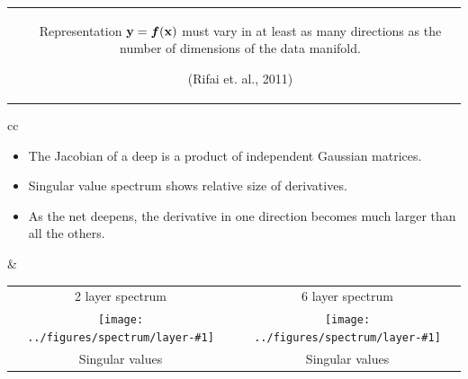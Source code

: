 \documentclass[portrait,a0b,final,a4resizeable]{include/a0poster}
\def\jointspacing{\vspace{0.3in}}
\newcommand{\spectrumpic}[1]{
\texttt{[image: ../figures/spectrum/layer-\#1]}}
\begin{document}
\begin{poster}
\begin{multicols}{2}
\begin{tabular}{cc}
\begin{minipage}[c]{0.45\columnwidth}
\end{minipage}
&
\begin{minipage}[c]{0.5\columnwidth}
Representation $\mathbf{y} = \boldsymbol{f}(\mathbf{x})$ must vary in at least as many directions as the number of dimensions of the data manifold.

(Rifai et. al., 2011)
\end{minipage}
\end{tabular}

\jointspacing










\begin{tabular}{cc}
\begin{minipage}[c]{0.4\columnwidth}

\begin{itemize}
\item The Jacobian of a deep \gp{} is a product of independent Gaussian matrices.
\item Singular value spectrum shows relative size of derivatives.
\item As the net deepens, the derivative in one direction becomes much larger than all the others.
\end{itemize}

\end{minipage}
&
\begin{minipage}[c]{0.55\columnwidth}
\begin{centering}
\begin{tabular}{cc}
2 layer spectrum & 6 layer spectrum \\
\hspace{-0.16in} \spectrumpic{2} &
\hspace{-0.16in} \spectrumpic{6} \\
Singular values & Singular values  
\end{tabular}
\end{centering}
\end{minipage}
\end{tabular}







\end{multicols}
\end{poster}
\end{document}
